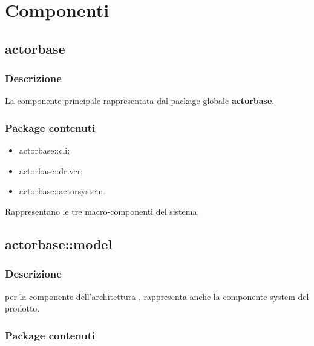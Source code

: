 \documentclass{scalatekids-article}
\begin{document}
\section{Componenti}

\subsection{actorbase}



\subsubsection{Descrizione}

La componente principale rappresentata dal package globale \textbf{actorbase}.

\subsubsection{Package contenuti}

\begin{itemize}
\item actorbase::cli;
\item actorbase::driver;
\item actorbase::actorsystem.
\end{itemize}

Rappresentano le tre macro-componenti del sistema.

\subsection{actorbase::model}

\subsubsection{Descrizione}

 per la componente  dell'architettura ,
rappresenta anche la componente system del prodotto.

\subsubsection{Package contenuti}
\end{document}
